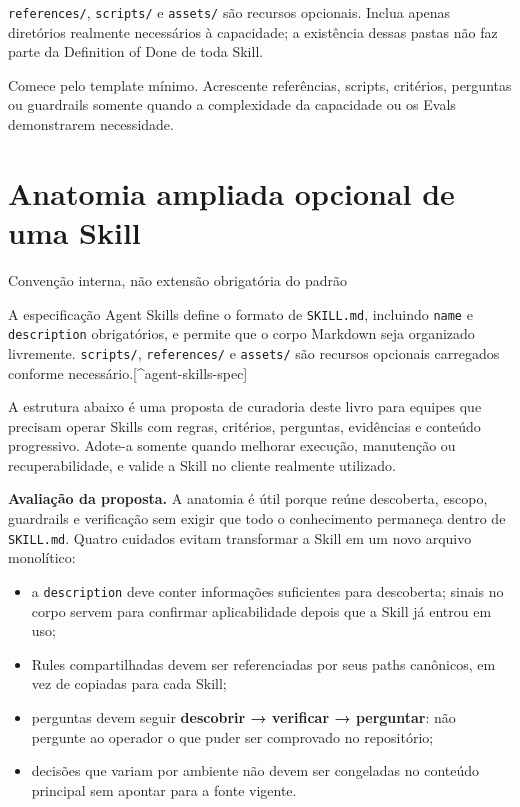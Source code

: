 \documentclass[
  10pt,
  a4paper,
  oneside]{book}
\providecommand{\tightlist}{%
  \setlength{\itemsep}{0pt}\setlength{\parskip}{0pt}}
\begin{document}
\texttt{references/}, \texttt{scripts/} e \texttt{assets/} são recursos
opcionais. Inclua apenas diretórios realmente necessários à capacidade;
a existência dessas pastas não faz parte da Definition of Done de toda
Skill.

Comece pelo template mínimo. Acrescente referências, scripts, critérios,
perguntas ou guardrails somente quando a complexidade da capacidade ou
os Evals demonstrarem necessidade.

\hypertarget{anatomia-ampliada-opcional-de-uma-skill}{%
\section{Anatomia ampliada opcional de uma
Skill}\label{anatomia-ampliada-opcional-de-uma-skill}}

\begin{curiousbox}{Convenção interna, não extensão obrigatória do padrão}

A especificação Agent Skills define o formato de \texttt{SKILL.md},
incluindo \texttt{name} e \texttt{description} obrigatórios, e permite
que o corpo Markdown seja organizado livremente. \texttt{scripts/},
\texttt{references/} e \texttt{assets/} são recursos opcionais
carregados conforme necessário.{[}\^{}agent-skills-spec{]}

A estrutura abaixo é uma proposta de curadoria deste livro para equipes
que precisam operar Skills com regras, critérios, perguntas, evidências
e conteúdo progressivo. Adote-a somente quando melhorar execução,
manutenção ou recuperabilidade, e valide a Skill no cliente realmente
utilizado.

\end{curiousbox}

\textbf{Avaliação da proposta.} A anatomia é útil porque reúne
descoberta, escopo, guardrails e verificação sem exigir que todo o
conhecimento permaneça dentro de \texttt{SKILL.md}. Quatro cuidados
evitam transformar a Skill em um novo arquivo monolítico:

\begin{itemize}
\tightlist
\item
  a \texttt{description} deve conter informações suficientes para
  descoberta; sinais no corpo servem para confirmar aplicabilidade
  depois que a Skill já entrou em uso;
\item
  Rules compartilhadas devem ser referenciadas por seus paths canônicos,
  em vez de copiadas para cada Skill;
\item
  perguntas devem seguir \textbf{descobrir → verificar → perguntar}: não
  pergunte ao operador o que puder ser comprovado no repositório;
\item
  decisões que variam por ambiente não devem ser congeladas no conteúdo
  principal sem apontar para a fonte vigente.
\end{itemize}
\end{document}
